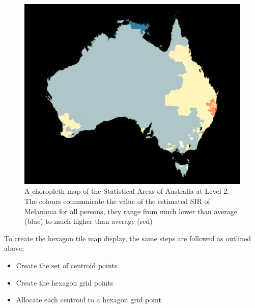 \documentclass{monashthesis}
\begin{document}
\begin{figure}[H]
\centering
\includegraphics[width=16cm]{figures/03-algorithm/aus_melanoma_p.pdf}
\caption{\label{fig:melanoma-geo}A choropleth map of the Statistical Areas of Australia at Level 2. The colours communicate the value of the estimated SIR of Melanoma for all persons, they range from much lower than average (blue) to much higher than average (red)}
\end{figure}

To create the hexagon tile map display, the same steps are followed as outlined above:

\begin{itemize}
\tightlist
\item
  Create the set of centroid points
\item
  Create the hexagon grid points
\item
  Allocate each centroid to a hexagon grid point
\end{itemize}
\end{document}
